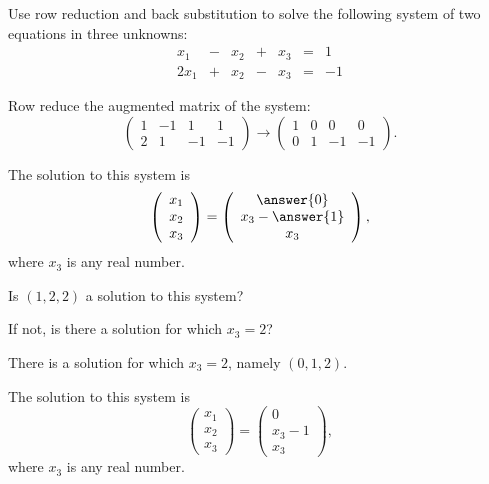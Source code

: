 \documentclass{ximera}
\begin{document}
\begin{exercise} \label{c2.3.9}
Use row reduction and back substitution to solve the following
system of two equations in three unknowns:
\[
\begin{array}{rcrcrcrc}
 x_1 & - & x_2 & + & x_3 & = & 1 \\
2x_1 & + & x_2 & - & x_3 & = & -1
\end{array}
\]
\begin{hint}
   Row reduce the augmented matrix of the system:
\[
\left(\begin{array}{rrr|r} 1 & -1 & 1 & 1 \\ 2 & 1 & -1 & -1\end{array}\right)
\longrightarrow
\left(\begin{array}{rrr|r} 1 & 0 & 0 & 0 \\ 0 & 1 & -1 & -1\end{array}\right).
\]
\end{hint}
\begin{prompt}
  The solution to this system is
\[
\left(\begin{array}{c} x_1 \\ x_2 \\ x_3\end{array}\right) =
\left(\begin{array}{c} \answer{0} \\ x_3 - \answer{1} \\ x_3\end{array}\right),
\]
where $x_3$ is any real number.
\end{prompt}
Is $(1,2,2)$ a solution to this system?
\begin{multipleChoice}
\end{multipleChoice}
If not, is there a solution for which $x_3=2$?
\begin{multipleChoice}
\end{multipleChoice}
\begin{hint}
  There is a solution for which $x_3 = 2$, namely $(0,1,2)$.
\end{hint}

\begin{solution}

\ans The solution to this system is
\[
\left(\begin{array}{c} x_1 \\ x_2 \\ x_3\end{array}\right) =
\left(\begin{array}{c} 0 \\ x_3 - 1 \\ x_3\end{array}\right),
\]
where $x_3$ is any real number.


\end{solution}
\end{exercise}
\end{document}
